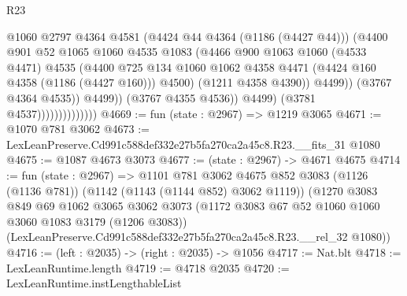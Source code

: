 \begin{lexlean}{R23}
\begin{coremodule}
                                          @1060
                                          @2797
                                          @4364
                                          @4581
                                          (@4424 @44 @4364 (@1186 (@4427 @44)))
                                          (@4400
                                            @901
                                            @52
                                            @1065
                                            @1060
                                            @4535
                                            @1083
                                            (@4466
                                              @900
                                              @1063
                                              @1060
                                              (@4533 @4471)
                                              @4535
                                              (@4400
                                                @725
                                                @134
                                                @1060
                                                @1062
                                                @4358
                                                @4471
                                                (@4424 @160 @4358 (@1186 (@4427 @160)))
                                                @4500)
                                              (@1211 @4358 @4390))
                                            @4499))
                                        (@3767 @4364 @4535))
                                      @4499))
                                  (@3767 @4355 @4536))
                                @4499)
                              (@3781 @4537))))))))))))))
@4669 := fun (state : @2967) => @1219 @3065
@4671 := @1070 @781 @3062
@4673 := LexLeanPreserve.Cd991c588def332e27b5fa270ca2a45c8.R23.__fits_31 @1080
@4675 := @1087 @4673 @3073
@4677 := (state : @2967) -> @4671 @4675
@4714 := fun (state : @2967) =>
  @1101
    @781
    @3062
    @4675
    @852
    @3083
    (@1126 (@1136 @781))
    (@1142 (@1143 (@1144 @852) @3062 @1119))
    (@1270
      @3083
      @849
      @69
      @1062
      @3065
      @3062
      @3073
      (@1172 @3083 @67 @52 @1060 @1060 @3060 @1083 @3179 (@1206 @3083))
      (LexLeanPreserve.Cd991c588def332e27b5fa270ca2a45c8.R23.__rel_32 @1080))
@4716 := (left : @2035) -> (right : @2035) -> @1056
@4717 := Nat.blt
@4718 := LexLeanRuntime.length
@4719 := @4718 @2035
@4720 := LexLeanRuntime.instLengthableList

\end{coremodule}
\end{lexlean}
